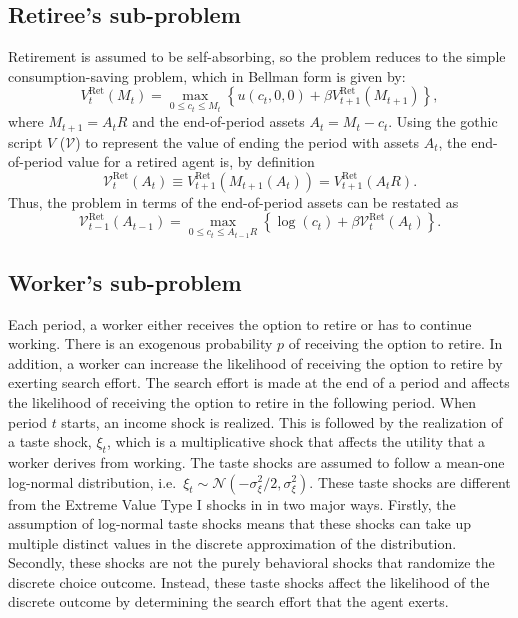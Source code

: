 \documentclass[11pt]{article}
\newcommand{\Ret}{\mathrm{Ret}}
\newcommand{\goth}[1]{\mathcal{#1}}   %
\begin{document}
\subsection{Retiree's sub-problem}
Retirement is assumed to be self-absorbing, so the problem reduces to the simple
consumption-saving problem, which in Bellman form is given by:
\begin{equation}
V_t^{\Ret}(M_t) = \max_{0 \le c_t \le M_t}
\left\{ u(c_t, 0, 0) + \beta V_{t+1}^{\Ret}(M_{t+1}) \right\},
\end{equation}
where $M_{t+1} = A_t R$ and the end-of-period assets $A_t = M_t - c_t$. Using the gothic script
$V$ ($\goth{V}$) to represent the value of ending the period with assets $A_t$, the end-of-period
value for a retired agent is, by definition
\begin{equation}
\goth{V}_t^{\Ret}(A_t) \equiv V_{t+1}^{\Ret}(M_{t+1}(A_t)) = V_{t+1}^{\Ret}(A_t R).
\end{equation}
Thus, the problem in terms of the end-of-period assets can be restated as
\begin{equation}
\goth{V}_{t-1}^{\Ret}(A_{t-1}) = \max_{0 \le c_t \le A_{t-1} R}
\left\{ \log(c_t) + \beta \goth{V}_t^{\Ret}(A_t) \right\}.
\end{equation}

\subsection{Worker's sub-problem}
Each period, a worker either receives the option to retire or has to continue working.
There is an exogenous probability $p$ of receiving the option to retire. In addition, a worker
can increase the likelihood of receiving the option to retire by exerting search effort.
The search effort is made at the end of a period and affects the likelihood of receiving
the option to retire in the following period. When period $t$ starts, an income shock is
realized. This is followed by the realization of a taste shock, $\xi_t$, which is a multiplicative
shock that affects the utility that a worker derives from working. The taste shocks are
assumed to follow a mean-one log-normal distribution, i.e.\ $\xi_t \sim \mathcal{N}(-\sigma_\xi^2/2, \sigma_\xi^2)$. These
taste shocks are different from the Extreme Value Type I shocks in \citet{ijrs2017}
in two major ways. Firstly, the assumption of log-normal
taste shocks means that these shocks can take up multiple distinct values in the discrete
approximation of the distribution. Secondly, these shocks are not the purely behavioral
shocks that randomize the discrete choice outcome. Instead, these taste shocks affect the
likelihood of the discrete outcome by determining the search effort that the agent exerts.
\end{document}

